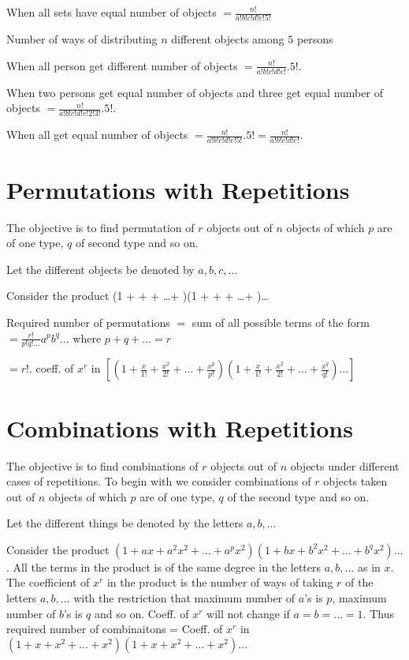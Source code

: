   \item When all sets have equal number of objects $= \frac{n!}{a!b!c!d!e!5!}$
  \stopitemize
\item Number of ways of distributing $n$ different objects among $5$ persons
  \startitemize[i]
  \item When all person get different number of objects $= \frac{n!}{a!b!c!d!e!}.5!$.
  \item When two persons get equal number of objects and three get equal number of objects $= \frac{n!}{a!b!c!d!e!2!3!}.5!$.
  \item When all get equal number of objects $= \frac{n!}{a!b!c!d!e!5!}.5! = \frac{n!}{a!b!c!d!e!}$.
  \stopitemize
\stopitemize

\section{Permutations with Repetitions}
The objective is to find permutation of $r$ objects out of $n$ objects of which $p$ are of one type, $q$ of second type and so on.

Let the different objects be denoted by $a, b, c, \ldots$

Consider the product \startformula \left(1 +  +  + \ldots + \right)\left(1 +  +
 + \ldots + \right)\ldots\stopformula

Required number of permutations $=$ sum of all possible terms of the form $= \frac{r!}{p!q!\ldots}a^pb^q\ldots$ where $p + q + \ldots
= r$

$= r!$. coeff. of $x^r$ in $\left[\left(1 + \frac{x}{1!} + \frac{x^2}{2!} + \ldots + \frac{x^p}{p!}\right)\left(1 + \frac{x}{1!} +
\frac{x^2}{2!} + \ldots + \frac{x^q}{q!}\right)\ldots\right]$

\section{Combinations with Repetitions}
The objective is to find combinations of $r$ objects out of $n$ objects under different cases of repetitions. To begin with we
consider combinations of $r$ objects taken out of $n$ objects of which $p$ are of one type, $q$ of the second type and so on.

Let the different things be denoted by the letters $a, b, \ldots$

Consider the product $(1 + ax + a^2x^2 + \ldots + a^px^2)(1 + bx + b^2x^2 + \ldots + b^qx^2)\ldots$. All the terms in the product
is of the same degree in the letters $a, b, \ldots$ as in $x$. The coefficient of $x^r$ in the product is the number of ways of
taking $r$ of the letters $a, b, \ldots$ with the restriction that maximum number of $a$'s is $p$, maximum number of $b$'s is $q$ and so
on. Coeff. of $x^r$ will not change if $a = b = \ldots = 1$. Thus required number of combinaitons = Coeff. of $x^r$ in $(1 + x + x^2 +
\ldots + x^2)(1 + x + x^2 + \ldots + x^2)\ldots$

